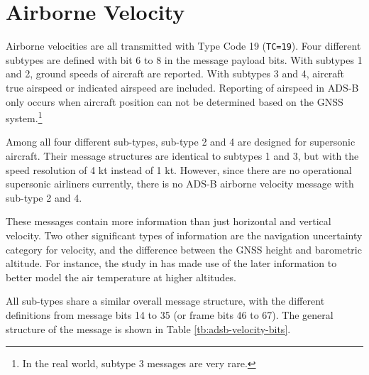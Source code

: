 \chapter{Airborne Velocity}

Airborne velocities are all transmitted with Type Code 19 (\texttt{TC=19}). Four different subtypes are defined with bit 6 to 8 in the message payload bits. With subtypes 1 and 2, ground speeds of aircraft are reported. With subtypes 3 and 4, aircraft true airspeed or indicated airspeed are included. Reporting of airspeed in ADS-B only occurs when aircraft position can not be determined based on the GNSS system.\footnote{In the real world, subtype 3 messages are very rare.}

Among all four different sub-types, sub-type 2 and 4 are designed for supersonic aircraft. Their message structures are identical to subtypes 1 and 3, but with the speed resolution of 4 kt instead of 1 kt. However, since there are no operational supersonic airliners currently, there is no ADS-B airborne velocity message with sub-type 2 and 4.

These messages contain more information than just horizontal and vertical velocity. Two other significant types of information are the navigation uncertainty category for velocity, and the difference between the GNSS height and barometric altitude. For instance, the study in \cite{stone2015} has made use of the later information to better model the air temperature at higher altitudes.

All sub-types share a similar overall message structure, with the different definitions from message bits 14 to 35 (or frame bits 46 to 67). The general structure of the message is shown in Table \ref{tb:adsb-velocity-bits}. 

